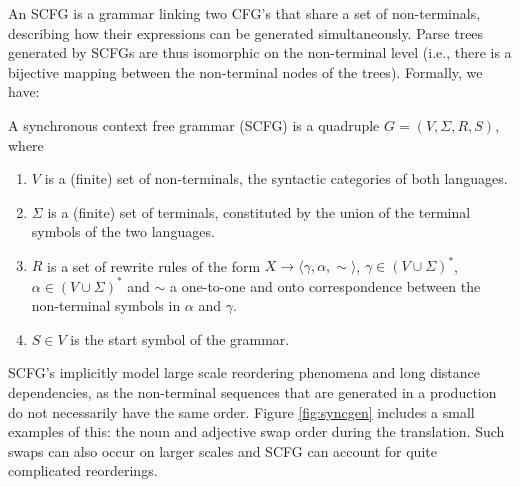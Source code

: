 An SCFG \citep{aho1969properties} is a grammar linking two CFG's that share a set of non-terminals, describing how their expressions can be generated simultaneously. Parse trees generated by SCFGs are thus isomorphic on the non-terminal level (i.e., there is a bijective mapping between the non-terminal nodes of the trees). Formally, we have:

\begin{definition}
A synchronous context free grammar (SCFG) is a quadruple $G = (V, \Sigma, R, S)$, where\begin{enumerate}
\item $V$ is a (finite) set of non-terminals, the syntactic categories of both languages.
\item $\Sigma$ is a (finite) set of terminals, constituted by the union of the terminal symbols of the two languages.
\item $R$ is a set of rewrite rules of the form $X\rightarrow\langle\gamma,\alpha,\sim\rangle$, $\gamma\in (V\cup\Sigma)^{*}$,  $\alpha\in (V\cup\Sigma)^{*}$ and $\sim$ a one-to-one and onto correspondence between the non-terminal symbols in $\alpha$ and $\gamma$.
\item $S\in V$ is the start symbol of the grammar.
\end{enumerate}
\end{definition}

SCFG's implicitly model large scale reordering phenomena and long distance dependencies, as the non-terminal sequences that are generated in a production do not necessarily have the same order. Figure \ref{fig:syncgen} includes a small examples of this: the noun and adjective swap order during the translation. Such swaps can also occur on larger scales and SCFG can account for quite complicated reorderings.

